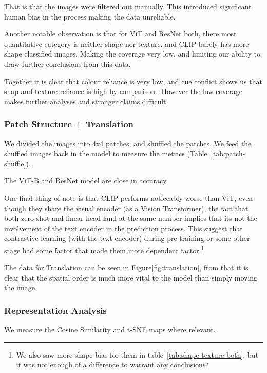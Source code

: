 \documentclass{article}
\begin{document}
That is that the images were filtered out manually. This introduced significant human bias in the process making the data unreliable.

Another notable observation is that for ViT and ResNet both, there most quantitative category is neither shape nor texture, and CLIP barely has more shape classified images.
Making the coverage very low, and limiting our ability to draw further conclusions from this data.

Together it is clear that colour reliance is very low, and cue conflict shows us that shap and texture reliance is high by comparison.. However the low coverage makes
further analyses and stronger claims difficult.

\subsubsection{Patch Structure + Translation}

We divided the images into 4x4 patches, and shuffled the patches. We feed the shuffled images back in the model to measure the metrics (Table~\ref{tab:patch-shuffle}).




The ViT-B and ResNet model are close in accuracy.

One final thing of note is that CLIP performs noticeably worse than ViT, even though they share the visual encoder (as a Vision Transformer), the fact that both zero-shot and linear head land at the same number
implies that its not the involvement of the text encoder in the prediction process. This suggest that contrastive learning (with the text encoder) during pre training or some other stage had some factor that made
them more dependent factor.\footnote{We also saw more shape bias for them in table~\ref{tab:shape-texture-both}, but it was not enough of a difference to warrant any conclusion}

The data for Translation can be seen in Figure\ref{fig:translation}, from that it is clear that the spatial order is much more vital to the model than simply moving the image.
\subsubsection{Representation Analysis}

We measure the Cosine Similarity and t-SNE maps where relevant.
\end{document}
